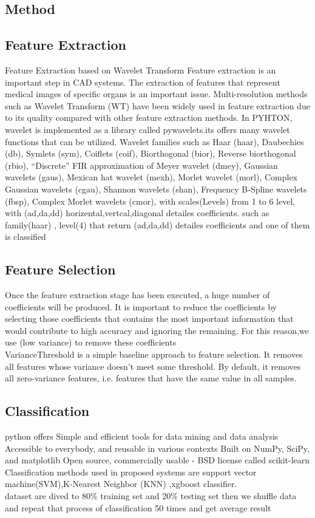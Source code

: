 \documentclass[hidelinks,12pt,xcolor=table]{article}
\begin{document}
\begin{multicols}{2}
\section{Method}
\subsection{Feature Extraction}
Feature Extraction based on Wavelet Transform
Feature extraction is an important step in CAD systems.
The extraction of features that represent medical images of
specific organs is an important issue. Multi-resolution
methods such as Wavelet Transform (WT) have been widely
used in feature extraction due to its quality compared with
other feature extraction methods.
In PYHTON, wavelet is implemented as a library called pywavelets.its
offers many wavelet functions that can be utilized. Wavelet
families such as Haar (haar),
Daubechies (db),
Symlets (sym),
Coiflets (coif),
Biorthogonal (bior),
Reverse biorthogonal (rbio),
“Discrete” FIR approximation of Meyer wavelet (dmey),
Gaussian wavelets (gaus),
Mexican hat wavelet (mexh),
Morlet wavelet (morl),
Complex Gaussian wavelets (cgau),
Shannon wavelets (shan),
Frequency B-Spline wavelets (fbsp),
Complex Morlet wavelets (cmor),
with scales(Levels)  from 1 to 6 level,
with (ad,da,dd) horizental,vertcal,diagonal detailes coefficients.
such as family(haar) , level(4)  that return (ad,da,dd) detailes coefficients and one of them is classified 


\subsection{Feature Selection}
Once the feature extraction stage has been executed, a
huge number of coefficients will be produced. It is
important to reduce the coefficients by selecting those
coefficients that contains the most important information
that would contribute to high accuracy and ignoring the
remaining. For this reason,we use (low variance) to remove these coefficients\\
VarianceThreshold is a simple baseline approach to feature selection. It removes all features whose variance doesn’t meet some threshold. By default, it removes all zero-variance features, i.e. features that have the same value in all samples.


\subsection{Classification}
python offers Simple and efficient tools for data mining and data analysis
Accessible to everybody, and reusable in various contexts
Built on NumPy, SciPy, and matplotlib 
Open source, commercially usable - BSD license called scikit-learn\\
Classification methods used in proposed  systems are support vector machine(SVM),K-Nearest Neighbor (KNN)
,xgboost classifier.\\
dataset are dived to 80\% training set and 20\% testing set then we shuffle data and repeat that
process of classification 50 times and get average result



\end{multicols}
\end{document}
